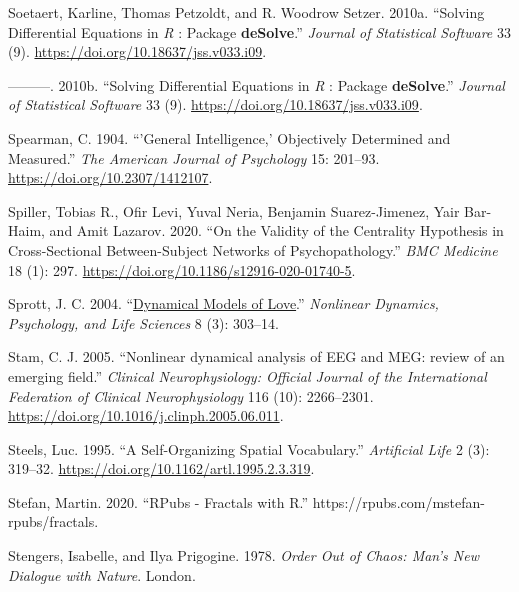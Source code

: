 \documentclass[
  letterpaper,
]{scrbook}
\newlength{\cslhangindent}
\newlength{\cslentryspacingunit} %
\newenvironment{CSLReferences}[2] %
 {%
  \setlength{\parindent}{0pt}
  \ifodd #1
  \let\oldpar\par
  \def\par{\hangindent=\cslhangindent\oldpar}
  \fi
  \setlength{\parskip}{#2\cslentryspacingunit}
 }%
 {}
\begin{document}
\begin{CSLReferences}{1}{0}
\leavevmode{}%
Soetaert, Karline, Thomas Petzoldt, and R. Woodrow Setzer. 2010a.
{``Solving {Differential Equations} in {\emph{R}} : {Package}
{\textbf{deSolve}}.''} \emph{Journal of Statistical Software} 33 (9).
\url{https://doi.org/10.18637/jss.v033.i09}.

\leavevmode{}%
---------. 2010b. {``Solving Differential Equations in {\emph{R}} :
Package {\textbf{deSolve}}.''} \emph{Journal of Statistical Software} 33
(9). \url{https://doi.org/10.18637/jss.v033.i09}.

\leavevmode{}%
Spearman, C. 1904. {``'{General} Intelligence,' Objectively Determined
and Measured.''} \emph{The American Journal of Psychology} 15: 201--93.
\url{https://doi.org/10.2307/1412107}.

\leavevmode{}%
Spiller, Tobias R., Ofir Levi, Yuval Neria, Benjamin Suarez-Jimenez,
Yair Bar-Haim, and Amit Lazarov. 2020. {``On the Validity of the
Centrality Hypothesis in Cross-Sectional Between-Subject Networks of
Psychopathology.''} \emph{BMC Medicine} 18 (1): 297.
\url{https://doi.org/10.1186/s12916-020-01740-5}.

\leavevmode{}%
Sprott, J. C. 2004.
{``\href{https://www.ncbi.nlm.nih.gov/pubmed/15233877}{Dynamical Models
of Love}.''} \emph{Nonlinear Dynamics, Psychology, and Life Sciences} 8
(3): 303--14.

\leavevmode{}%
Stam, C. J. 2005. {``Nonlinear dynamical analysis of EEG and MEG: review
of an emerging field.''} \emph{Clinical Neurophysiology: Official
Journal of the International Federation of Clinical Neurophysiology} 116
(10): 2266--2301. \url{https://doi.org/10.1016/j.clinph.2005.06.011}.

\leavevmode{}%
Steels, Luc. 1995. {``A {Self-Organizing Spatial Vocabulary}.''}
\emph{Artificial Life} 2 (3): 319--32.
\url{https://doi.org/10.1162/artl.1995.2.3.319}.

\leavevmode{}%
Stefan, Martin. 2020. {``{RPubs} - {Fractals} with {R}.''}
https://rpubs.com/mstefan-rpubs/fractals.

\leavevmode{}%
Stengers, Isabelle, and Ilya Prigogine. 1978. \emph{Order {Out} of
{Chaos}: {Man}'s {New Dialogue} with {Nature}}. {London}.


\end{CSLReferences}
\end{document}

